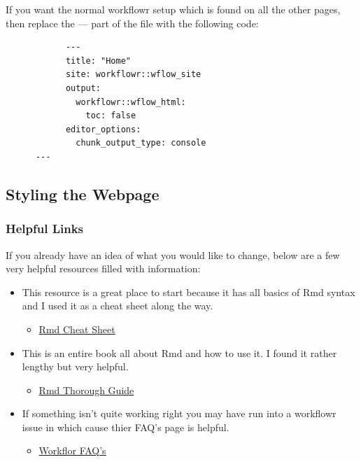 \documentclass[]{book}
\providecommand{\tightlist}{%
  \setlength{\itemsep}{0pt}\setlength{\parskip}{0pt}}
\begin{document}
If you want the normal workflowr setup which is found on all the other pages, then replace the --- part of the file with the following code:

\begin{verbatim}
            ---
            title: "Home"
            site: workflowr::wflow_site
            output:
              workflowr::wflow_html:
                toc: false
            editor_options:
              chunk_output_type: console
      ---
\end{verbatim}

\hypertarget{styling-the-webpage}{%
\subsection{Styling the Webpage}\label{styling-the-webpage}}

\hypertarget{helpful-links}{%
\subsubsection{Helpful Links}\label{helpful-links}}

If you already have an idea of what you would like to change, below are a few very helpful resources filled with information:

\begin{itemize}
\tightlist
\item
  This resource is a great place to start because it has all basics of Rmd syntax and I used it as a cheat sheet along the way.

  \begin{itemize}
  \tightlist
  \item
    \href{https://rmarkdown.rstudio.com/authoring_basics.html}{Rmd Cheat Sheet}
  \end{itemize}
\item
  This is an entire book all about Rmd and how to use it. I found it rather lengthy but very helpful.

  \begin{itemize}
  \tightlist
  \item
    \href{https://bookdown.org/yihui/rmarkdown/html-document.html\#appearance_and_style}{Rmd Thorough Guide}
  \end{itemize}
\item
  If something isn't quite working right you may have run into a workflowr issue in which cause thier FAQ's page is helpful.

  \begin{itemize}
  \tightlist
  \item
    \href{https://jdblischak.github.io/workflowr/articles/wflow-05-faq.html}{Workflor FAQ's}
  \end{itemize}
\end{itemize}
\end{document}
